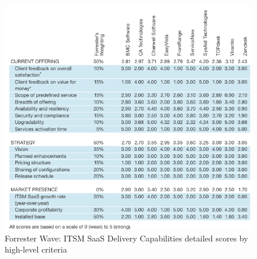 \begin{figure}
\centering
\includegraphics{img/ITSMForrScores.png}
\caption{Forrester Wave: ITSM SaaS Delivery Capabilities detailed scores by high-level criteria}
\end{figure}

